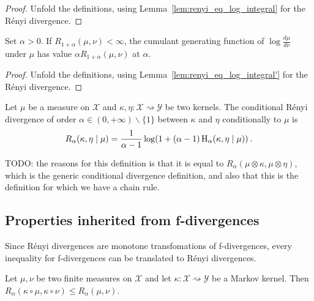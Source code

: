 \begin{proof}%
{}
Unfold the definitions, using Lemma~\ref{lem:renyi_eq_log_integral} for the Rényi divergence.
\end{proof}


\begin{lemma}
  \label{lem:renyi_cgf_2}
  Set $\alpha > 0$. If $R_{1+\alpha}(\mu, \nu) < \infty$, the cumulant generating function of $\log\frac{d\mu}{d\nu}$ under $\mu$ has value $\alpha R_{1+\alpha}(\mu, \nu)$ at $\alpha$.
\end{lemma}

\begin{proof}%
{}
Unfold the definitions, using Lemma~\ref{lem:renyi_eq_log_integral'} for the Rényi divergence.
\end{proof}


\begin{definition}
  \label{def:condRenyi}
  \leanok
  Let $\mu$ be a measure on $\mathcal X$ and $\kappa, \eta : \mathcal X \rightsquigarrow \mathcal Y$ be two kernels. The conditional Rényi divergence of order $\alpha \in (0,+\infty) \backslash \{1\}$ between $\kappa$ and $\eta$ conditionally to $\mu$ is
  \begin{align*}
  R_\alpha(\kappa, \eta \mid \mu) =\frac{1}{\alpha - 1} \log (1 + (\alpha - 1) \operatorname{H}_\alpha(\kappa, \eta \mid \mu)) \: .
  \end{align*}
\end{definition}

TODO: the reasons for this definition is that it is equal to $R_\alpha(\mu \otimes \kappa, \mu \otimes \eta)$, which is the generic conditional divergence definition, and also that this is the definition for which we have a chain rule.




\subsection{Properties inherited from f-divergences}

Since Rényi divergences are monotone transfomations of f-divergences, every inequality for f-divergences can be translated to Rényi divergences.

\begin{theorem}
  \label{thm:renyi_data_proc}
  \leanok
  Let $\mu, \nu$ be two finite measures on $\mathcal X$ and let $\kappa : \mathcal X \rightsquigarrow \mathcal Y$ be a Markov kernel.
  Then $R_\alpha(\kappa \circ \mu, \kappa \circ \nu) \le R_\alpha(\mu, \nu)$.
\end{theorem}

